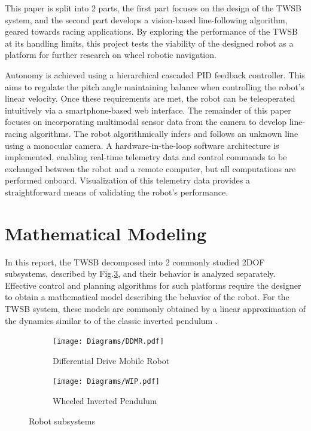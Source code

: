     This paper is split into 2 parts, the first part focuses on the design of the TWSB system, and the second part
    develops a vision-based line-following algorithm, geared towards racing applications. By exploring 
    the performance of the TWSB at its handling limits, this project tests the viability of the designed robot
    as a platform for further research on wheel robotic navigation. 

    Autonomy is achieved using a hierarchical cascaded PID feedback controller. This aims 
    to regulate the pitch angle maintaining balance when controlling the robot's linear velocity. 
    Once these requirements are met, the robot can be teleoperated intuitively via a 
    smartphone-based web interface. The remainder of this paper focuses on incorporating 
    multimodal sensor data from the camera to develop line-racing algorithms.
    The robot algorithmically infers and follows an unknown line using a monocular camera. 
    A hardware-in-the-loop software architecture is implemented, enabling real-time telemetry data and control 
    commands to be exchanged between the robot and a remote computer, but all computations are performed onboard. 
    Visualization of this telemetry data provides a straightforward means of validating the robot's performance.


    \section{Mathematical Modeling} %
    In this report, the TWSB decomposed into 2 commonly studied 2DOF subsystems, described by Fig.\ref{fig:2DOF}, and their behavior is analyzed
    separately.
    Effective control and planning algorithms for such platforms require the designer to obtain a mathematical model describing the behavior
    of the robot.  
    For the TWSB system, these models are commonly obtained by a linear approximation of the dynamics similar to 
    of the classic inverted pendulum \cite{AdvancedWIP}.
        \begin{figure}[h]
            \centering
            \begin{subfigure}[b]{0.4\textwidth}
                \texttt{[image: Diagrams/DDMR.pdf]}
                \caption{Differential Drive Mobile Robot}
                \label{fig:DDMR}
            \end{subfigure}
            \hfill
            \begin{subfigure}[b]{0.4\textwidth}
                \texttt{[image: Diagrams/WIP.pdf]}
                \caption{Wheeled Inverted Pendulum}
                \label{fig:WIP}
            \end{subfigure}        
            \caption{Robot subsystems}
            \label{fig:2DOF}
        \end{figure}


